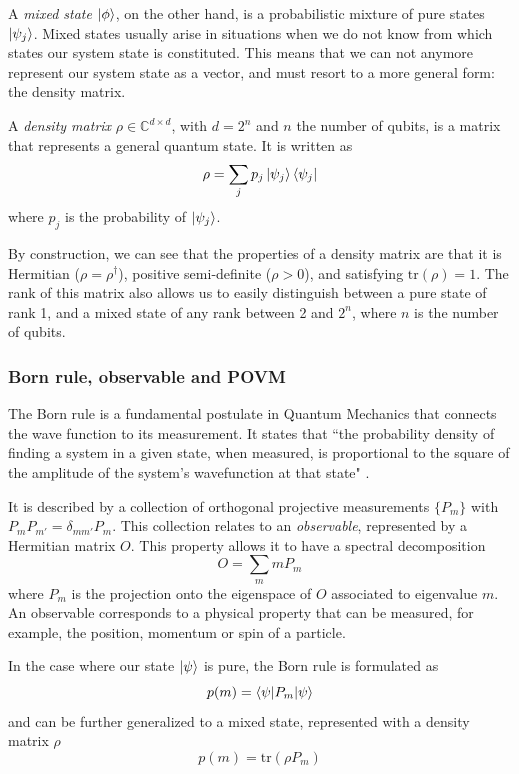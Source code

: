 \documentclass[12pt]{memoir}
\newcommand{\tr}{\text{tr}}
\begin{document}
A \textit{mixed state} $\ket \phi$, on the other hand, is a probabilistic mixture of pure states $\ket {\psi_j}$. Mixed states usually arise in situations when we do not know from which states our system state is constituted. This means that we can not anymore represent our system state as a vector, and must resort to a more general form: the density matrix.\medbreak

A \textit{density matrix} $\rho \in \mathbb{C}^{d \times d}$, with $d = 2^n$ and $n$ the number of qubits, is a matrix that represents a general quantum state. It is written as
\begin{equation}
    \rho = \sum_{j} p_j \ket{\psi_j} \bra{\psi_j}
\end{equation}
where $p_j$ is the probability of $\ket{\psi_j}$.\medbreak

By construction, we can see that the properties of a density matrix are that it is Hermitian ($\rho = \rho^{\dagger}$), positive semi-definite ($\rho > 0$), and satisfying $\tr(\rho) = 1$. The rank of this matrix also allows us to easily distinguish between a pure state of rank 1, and a mixed state of any rank between 2 and $2^n$, where $n$ is the number of qubits.

\subsubsection*{Born rule, observable and POVM}

The Born rule is a fundamental postulate in Quantum Mechanics that connects the wave function to its measurement. It states that ``the probability density of finding a system in a given state, when measured, is proportional to the square of the amplitude of the system's wavefunction at that state" \cite{wiki:born-rule}.\medbreak

It is described by a collection of orthogonal projective measurements $\{P_m\}$ with $P_mP_{m'}=\delta_{mm'}P_m$. This collection relates to an \textit{observable}, represented by a Hermitian matrix $O$. This property allows it to have a spectral decomposition
\begin{equation}
    O = \sum_m m P_m
\end{equation}
where $P_m$ is the projection onto the eigenspace of $O$ associated to eigenvalue $m$. An observable corresponds to a physical property that can be measured, for example, the position, momentum or spin of a particle.\medbreak

In the case where our state $\ket \psi$ is pure, the Born rule is formulated as
\begin{equation}
    p(m) = \braket{\psi|P_m|\psi}
\end{equation}
and can be further generalized to a mixed state, represented with a density matrix $\rho$
\begin{equation}\label{eq:quantum-measurement}
    p(m) = \tr(\rho P_m)
\end{equation}
\end{document}
